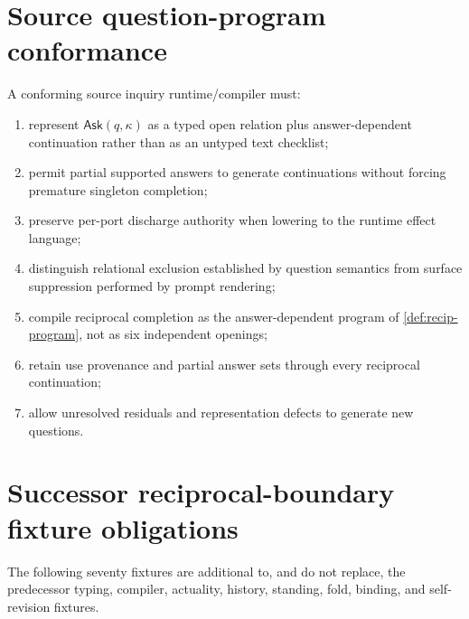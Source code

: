 \documentclass[11pt,oneside]{article}
\begin{document}
\section{Source question-program conformance}

A conforming source inquiry runtime/compiler must:
\begin{enumerate}
\item represent \(\mathsf{Ask}(q,\kappa)\) as a typed open relation plus answer-dependent continuation rather than as an untyped text checklist;
\item permit partial supported answers to generate continuations without forcing premature singleton completion;
\item preserve per-port discharge authority when lowering to the runtime effect language;
\item distinguish relational exclusion established by question semantics from surface suppression performed by prompt rendering;
\item compile reciprocal completion as the answer-dependent program of \cref{def:recip-program}, not as six independent openings;
\item retain use provenance and partial answer sets through every reciprocal continuation;
\item allow unresolved residuals and representation defects to generate new questions.
\end{enumerate}

\section{Successor reciprocal-boundary fixture obligations}\label{sec:successor-fixtures}

The following seventy fixtures are additional to, and do not replace, the predecessor typing, compiler, actuality, history, standing, fold, binding, and self-revision fixtures.
\end{document}
